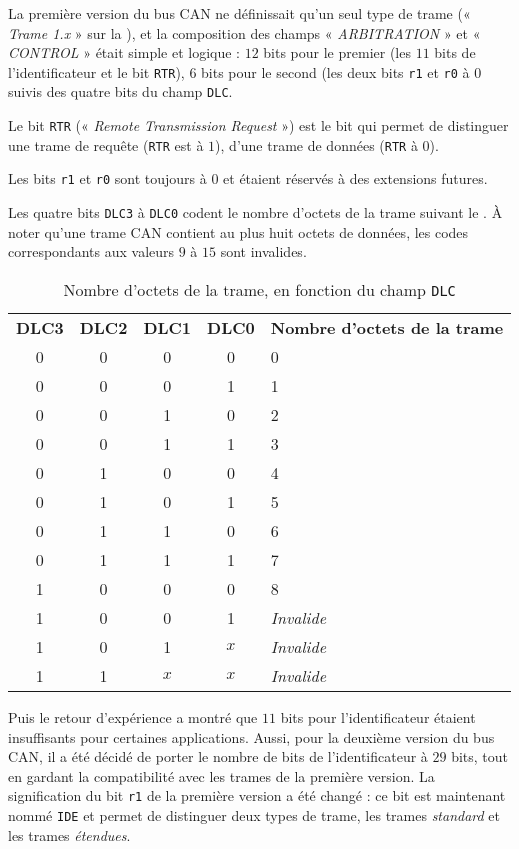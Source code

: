 La première version du bus CAN ne définissait qu'un seul type de trame (« \emph{Trame 1.x} » sur la ), et la composition des champs « \emph{ARBITRATION} » et « \emph{CONTROL} »  était simple et logique : $12$ bits pour le premier (les $11$ bits de l'identificateur et le bit \texttt{RTR}), $6$ bits pour le second (les deux bits \texttt{r1} et \texttt{r0} à $0$ suivis des quatre bits du champ \texttt{DLC}.

Le bit \texttt{RTR} (« \emph{Remote Transmission Request} ») est le bit qui permet de distinguer une trame de requête (\texttt{RTR} est à $1$), d'une trame de données (\texttt{RTR} à $0$).

Les bits \texttt{r1} et \texttt{r0} sont toujours à $0$ et étaient réservés à des extensions futures.

Les quatre bits \texttt{DLC3} à \texttt{DLC0} codent le nombre d'octets de la trame suivant le . À noter qu'une trame CAN contient au plus huit octets de données, les codes correspondants aux valeurs $9$ à $15$ sont invalides.

\begin{table}[!t]
  \small
  \centering
  \begin{tabular}{ccccl}
    \textbf{DLC3}& \textbf{DLC2} & \textbf{DLC1} & \textbf{DLC0}  & \textbf{Nombre d'octets de la trame} \\
     0 & 0 & 0 & 0 & 0 \\
     0 & 0 & 0 & 1 & 1 \\
     0 & 0 & 1 & 0 & 2 \\
     0 & 0 & 1 & 1 & 3 \\
     0 & 1 & 0 & 0 & 4 \\
     0 & 1 & 0 & 1 & 5 \\
     0 & 1 & 1 & 0 & 6 \\
     0 & 1 & 1 & 1 & 7 \\
     1 & 0 & 0 & 0 & 8 \\
     1 & 0 & 0 & 1 & \emph{Invalide} \\
     1 & 0 & 1 & $x$ & \emph{Invalide} \\
     1 & 1 & $x$ & $x$ & \emph{Invalide} \\
   \end{tabular}
  \caption{Nombre d'octets de la trame, en fonction du champ \texttt{DLC}}
  \ligne
\end{table}

Puis le retour d'expérience a montré que $11$ bits pour l'identificateur étaient insuffisants pour certaines applications. Aussi, pour la deuxième version du bus CAN, il a été décidé de porter le nombre de bits de l'identificateur à $29$ bits, tout en gardant la compatibilité avec les trames de la première version. La signification du bit \texttt{r1} de la première version a été changé : ce bit est maintenant nommé \texttt{IDE} et permet de distinguer deux types de trame, les trames \emph{standard} et les trames \emph{étendues}.

